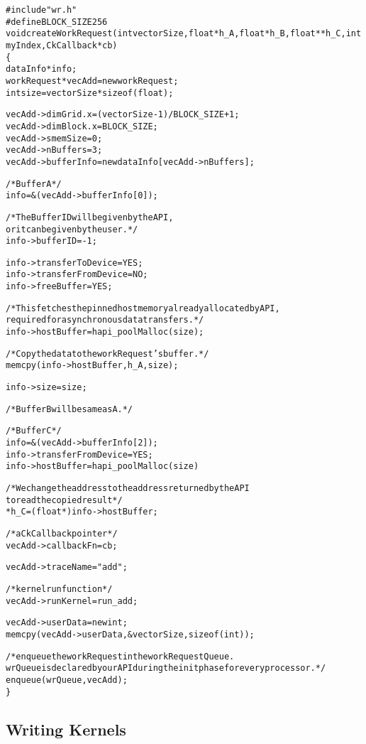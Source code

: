 \documentclass[10pt]{report}
\begin{document}
\begin{alltt}
#include "wr.h"
#define BLOCK_SIZE 256
void createWorkRequest(int vectorSize, float *h_A, float *h_B, float **h_C, int myIndex, CkCallback *cb)
\{
    dataInfo *info;
    workRequest *vecAdd = new workRequest;
    int size = vectorSize * sizeof(float);

    vecAdd->dimGrid.x = (vectorSize - 1) / BLOCK_SIZE + 1;
    vecAdd->dimBlock.x = BLOCK_SIZE;
    vecAdd->smemSize = 0;
    vecAdd->nBuffers = 3;
    vecAdd->bufferInfo = new dataInfo[vecAdd->nBuffers];

    /* Buffer A */
    info = &(vecAdd->bufferInfo[0]);

    /* The Buffer ID will be given by the API,
       or it can be given by the user. */
    info->bufferID = -1;

    info->transferToDevice = YES;
    info->transferFromDevice = NO;
    info->freeBuffer = YES;

    /* This fetches the pinned host memory already allocated by API,
       required for asynchronous data transfers. */
    info->hostBuffer = hapi_poolMalloc(size);

    /* Copy the data to the workRequest's buffer. */
    memcpy(info->hostBuffer, h_A, size);

    info->size = size;

    /* Buffer B will be same as A.*/

    /* Buffer C */
    info = &(vecAdd->bufferInfo[2]);
    info->transferFromDevice = YES;
    info->hostBuffer = hapi_poolMalloc(size)

    / * We change the address to the address returned by the API
        to read the copied result */
    *h_C = (float *)info->hostBuffer;

    /* a CkCallback pointer */
    vecAdd->callbackFn = cb;

    vecAdd->traceName = "add";

    /* kernel run function */
    vecAdd->runKernel = run_add;

    vecAdd->userData = new int;
    memcpy(vecAdd->userData, &vectorSize, sizeof(int));

    /* enqueue the workRequest in the workRequestQueue.
    wrQueue is declared by our API during the init phase for every processor. */
    enqueue(wrQueue, vecAdd);
\}
\end{alltt}

\subsection{Writing Kernels}
\end{document}
